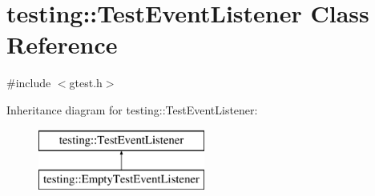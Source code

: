 \hypertarget{classtesting_1_1_test_event_listener}{}\section{testing\+::Test\+Event\+Listener Class Reference}
\label{classtesting_1_1_test_event_listener}


{\ttfamily \#include $<$gtest.\+h$>$}

Inheritance diagram for testing\+::Test\+Event\+Listener\+:\begin{figure}[H]
\begin{center}
\leavevmode
\includegraphics[height=2.000000cm]{classtesting_1_1_test_event_listener}
\end{center}
\end{figure}
